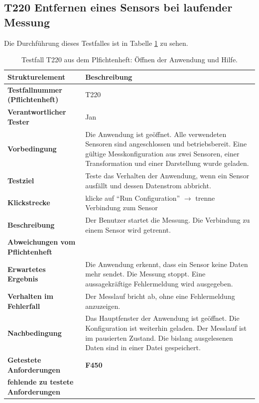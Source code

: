 \documentclass[parskip=full]{scrartcl}
\begin{document}
\subsection{\textbf{T220} Entfernen eines Sensors bei laufender Messung}

Die Durchführung dieses Testfalles ist in Tabelle \ref{testfallT220} zu sehen.

\begin{table}[h]
\begin{tabular}{| p{4cm} | p{10cm} |}
	\hline
	\textbf{Strukturelement} & \textbf{Beschreibung} \\ \hline
	\textbf{Testfallnummer (Pflichtenheft)}
	& 
	T220
	\\ \hline
	\textbf{Verantwortlicher Tester}
	& 
	Jan
	\\ \hline
	\textbf{Vorbedingung}
	& 
	Die Anwendung ist geöffnet. Alle verwendeten Sensoren sind angeschlossen und betriebsbereit. Eine gültige Messkonfiguration aus zwei Sensoren, einer Transformation und einer Darstellung wurde geladen.
	\\ \hline
	\textbf{ Testziel}
	& 
	Teste das Verhalten der Anwendung, wenn ein Sensor ausfällt und dessen Datenstrom abbricht.
	\\ \hline
	
	\textbf{Klickstrecke}
	& 
	klicke auf ``Run Configuration'' $\rightarrow$ trenne Verbindung zum Sensor
	\\ \hline
	
	\textbf{ Beschreibung}
	& 
	Der Benutzer startet die Messung. Die Verbindung zu einem Sensor wird getrennt.
	\\ \hline
	
	\textbf{Abweichungen vom Pflichtenheft}
	& 
	

	\\ \hline
	
	\textbf{Erwartetes Ergebnis}
	& 
	Die Anwendung erkennt, dass ein Sensor keine Daten mehr sendet. Die Messung stoppt. Eine aussagekräftige Fehlermeldung wird ausgegeben.
	\\ \hline
			
	\textbf{Verhalten im Fehlerfall}
	& 
	Der Messlauf bricht ab, ohne eine Fehlermeldung anzuzeigen.
	\\ \hline
	
	\textbf{Nachbedingung}
	& 
	Das Hauptfenster der Anwendung ist geöffnet. Die Konfiguration ist weiterhin geladen. Der Messlauf ist im pausierten Zustand. Die bislang ausgelesenen Daten sind in einer Datei gespeichert.
	\\ \hline
	
	
	\textbf{Getestete Anforderungen}
	& 
	\textbf{F450}
	\\ \hline
	\textbf{fehlende zu testete Anforderungen}
	& 
	
	
	\\ \hline
	
	
\end{tabular}
\caption{Testfall T220 aus dem Plfichtenheft: Öffnen der Anwendung und Hilfe.}
\label{testfallT220}
\end{table}
\end{document}
